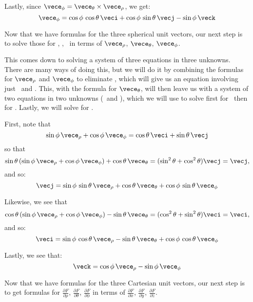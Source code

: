 {Lastly, since $\vece_{\phi}=\vece_{\theta}\times\vece_{\rho}$, we get:
\begin{equation}
 \vece_{\phi} = \cos\phi\,\cos\theta\,\veci + \cos\phi\,\sin\theta\,\vecj - \sin\phi\,\veck
\end{equation}

Now that we have formulas for the three spherical unit vectors, our next step is to solve those for \veci, \vecj, \veck\ in terms of $\vece_{\rho}$, $\vece_{\theta}$, $\vece_{\phi}$.

This comes down to solving a system of three equations in three unknowns. There are many ways of doing this, but we will do it by combining the formulas for $\vece_{\rho}$ and $\vece_{\phi}$ to eliminate \veck, which will give us an equation involving just \veci\ and \vecj. This, with the formula for $\vece_{\theta}$, will then leave us with a system of two equations in two unknowns (\veci\ and \vecj), which we will use to solve first for \vecj\ then for \veci. Lastly, we will solve for \veck.

First, note that
\[
 \sin\phi\,\vece_{\rho} + \cos\phi\,\vece_{\phi} = \cos\theta\,\veci + \sin\theta\,\vecj
\]
so that
\[
 \sin\theta\,(\sin\phi\,\vece_{\rho} + \cos\phi\,\vece_{\phi}) + \cos\theta\,\vece_{\theta} =
  (\sin^2 \theta + \cos^2 \theta)\vecj = \vecj ,
\]
and so:
\begin{equation}\label{j_sphere}
 \vecj = \sin\phi\,\sin\theta\,\vece_{\rho} + \cos\theta\,\vece_{\theta} + \cos\phi\,\sin\theta\,\vece_{\phi}
\end{equation}

Likewise, we see that
\[
 \cos\theta\,(\sin\phi\,\vece_{\rho} + \cos\phi\,\vece_{\phi}) - \sin\theta\,\vece_{\theta} =
  (\cos^2 \theta + \sin^2 \theta)\veci = \veci ,
\]
and so:
\begin{equation}\label{i_sphere}
 \veci = \sin\phi\,\cos\theta\,\vece_{\rho} - \sin\theta\,\vece_{\theta} + \cos\phi\,\cos\theta\,\vece_{\phi}
\end{equation}

Lastly, we see that:
\begin{equation}\label{k_sphere}
 \veck = \cos\phi\,\vece_{\rho} - \sin\phi\,\vece_{\phi}
\end{equation}

Now that we have formulas for the three Cartesian unit vectors, our next step is to get formulas for $\frac{\partial F}{\partial \rho}$, $\frac{\partial F}{\partial \theta}$, $\frac{\partial F}{\partial \phi}$ in terms of $\frac{\partial F}{\partial x}$, $\frac{\partial F}{\partial y}$, $\frac{\partial F}{\partial z}$.

}
